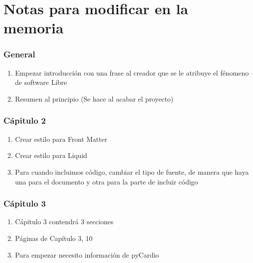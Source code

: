 
\chapter*{Notas para modificar en la memoria}
\subsection*{General}
\begin{enumerate}
    \item Empezar introducción con una frase al creador que se le atribuye el fénomeno de  software Libre
    \item Resumen al principio (Se hace al acabar el proyecto)
\end{enumerate}
\subsection*{Cápitulo 2}
\begin{enumerate}
    \item Crear estilo para Front Matter
    \item Crear estilo para Liquid
    \item Para cuando incluimos código, cambiar el tipo de fuente, de manera que haya una para el documento y otra para la parte de incluir código
\end{enumerate}
\subsection*{Cápitulo 3}
\begin{enumerate}
    \item Cápitulo 3 contendrá 3 secciones
    \item Páginas de Capítulo 3, 10
    \item Para empezar necesito información de pyCardio
\end{enumerate}
